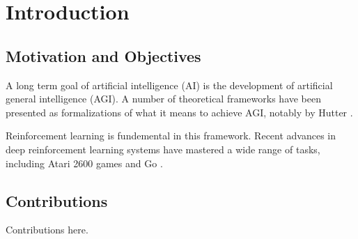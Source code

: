 \chapter{Introduction}

\section{Motivation and Objectives}

A long term goal of artificial intelligence (AI) is the development of artificial general intelligence (AGI). 	A number of theoretical frameworks have been presented as formalizations of what it means to achieve AGI, notably by Hutter \cite{Hutter2005}.

Reinforcement learning is fundemental in this framework. Recent advances in deep reinforcement learning systems have mastered a wide range of tasks, including Atari 2600 games and Go \cite{Mnih2015}.

\section{Contributions}

Contributions here.